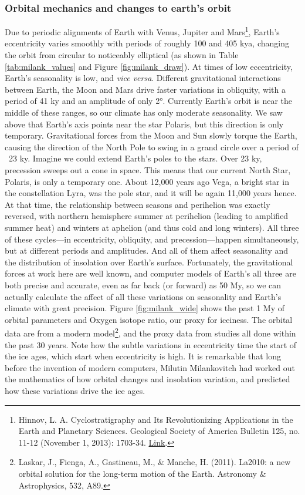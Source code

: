 \subsubsection{Orbital mechanics and changes to earth's orbit}
Due to periodic alignments of Earth with Venus, Jupiter and Mars\footnote{Hinnov, L. A. Cyclostratigraphy and Its Revolutionizing Applications in the Earth and Planetary Sciences. Geological Society of America Bulletin 125, no. 11-12 (November 1, 2013): 1703-34. \href{https://doi.org/10.1130/B30934.1}{Link}.}, Earth's eccentricity varies smoothly with periods of roughly 100 and 405 kya, changing the orbit from circular to noticeably elliptical (as shown in Table \ref{tab:milank_values} and Figure \ref{fig:milank_draw}). At times of low eccentricity, Earth's seasonality is low, and \textit{vice versa}. Different gravitational interactions between Earth, the Moon and Mars drive faster variations in obliquity, with a period of 41 ky and an amplitude of only \ang{2}. Currently Earth's orbit is near the middle of these ranges, so our climate has only moderate seasonality. We saw above that Earth's axis points near the star Polaris, but this direction is only temporary. Gravitational forces from the Moon and Sun slowly torque the Earth, causing the direction of the North Pole to swing in a grand circle over a period of ~23 ky. Imagine we could extend Earth's poles to the stars. Over 23 ky, precession sweeps out a cone in space. This means that our current North Star, Polaris, is only a temporary one. About 12,000 years ago Vega, a bright star in the constellation Lyra, was the pole star, and it will be again 11,000 years hence. At that time, the relationship between seasons and perihelion was exactly reversed, with northern hemisphere summer at perihelion (leading to amplified summer heat) and winters at aphelion (and thus cold and long winters). All three of these cycles---in eccentricity, obliquity, and precession---happen simultaneously, but at different periods and amplitudes. And all of them affect seasonality and the distribution of insolation over Earth's surface. Fortunately, the gravitational forces at work here are well known, and computer models of Earth's all three are both precise and accurate, even as far back (or forward) as 50 My, so we can actually calculate the affect of all these variations on seasonality and Earth's climate with great precision. Figure \ref{fig:milank_wide} shows the past 1 My of orbital parameters and Oxygen isotope ratio, our proxy for iceiness. The orbital data are from a modern model\footnote{Laskar, J., Fienga, A., Gastineau, M., \& Manche, H. (2011). La2010: a new orbital solution for the long-term motion of the Earth. Astronomy \& Astrophysics, 532, A89.}, and the proxy data from studies all done within the past 30 years. Note how the subtle variations in eccentricity time the start of the ice ages, which start when eccentricity is high. It is remarkable that long before the invention of modern computers, Milutin Milankovitch had worked out the mathematics of how orbital changes and insolation variation, and predicted how these variations drive the ice ages.\\


